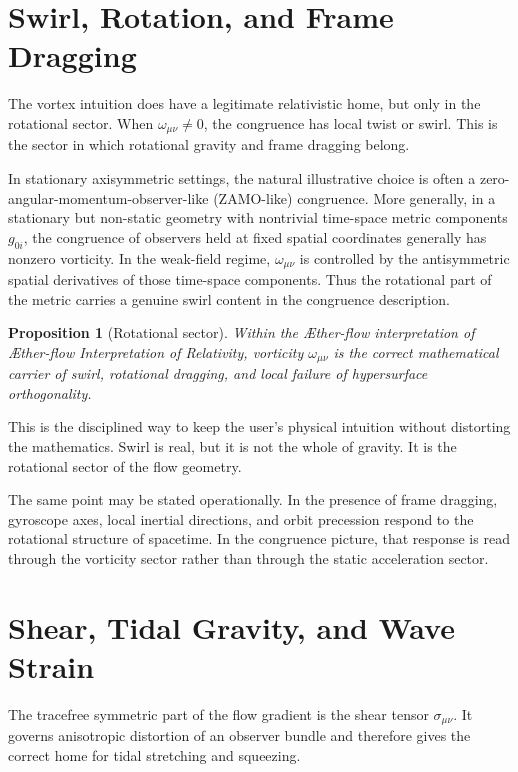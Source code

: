 \documentclass[11pt]{article}
\newcommand{\Aflow}{\AE{}ther-flow}
\newcommand{\TheoryName}{\Aflow{} Interpretation of Relativity}
\newtheorem{proposition}{Proposition}
\begin{document}
\section{Swirl, Rotation, and Frame Dragging}

The vortex intuition does have a legitimate relativistic home, but only in the rotational sector. When \(\omega_{\mu\nu}\neq 0\), the congruence has local twist or swirl. This is the sector in which rotational gravity and frame dragging belong.

In stationary axisymmetric settings, the natural illustrative choice is often a zero-angular-momentum-observer-like (ZAMO-like) congruence. More generally, in a stationary but non-static geometry with nontrivial time-space metric components \(g_{0i}\), the congruence of observers held at fixed spatial coordinates generally has nonzero vorticity. In the weak-field regime, \(\omega_{\mu\nu}\) is controlled by the antisymmetric spatial derivatives of those time-space components. Thus the rotational part of the metric carries a genuine swirl content in the congruence description.

\begin{proposition}[Rotational sector]
Within the \Aflow{} interpretation of \TheoryName{}, vorticity \(\omega_{\mu\nu}\) is the correct mathematical carrier of swirl, rotational dragging, and local failure of hypersurface orthogonality.
\end{proposition}

This is the disciplined way to keep the user's physical intuition without distorting the mathematics. Swirl is real, but it is not the whole of gravity. It is the rotational sector of the flow geometry.

The same point may be stated operationally. In the presence of frame dragging, gyroscope axes, local inertial directions, and orbit precession respond to the rotational structure of spacetime. In the congruence picture, that response is read through the vorticity sector rather than through the static acceleration sector.

\section{Shear, Tidal Gravity, and Wave Strain}

The tracefree symmetric part of the flow gradient is the shear tensor \(\sigma_{\mu\nu}\). It governs anisotropic distortion of an observer bundle and therefore gives the correct home for tidal stretching and squeezing.
\end{document}
